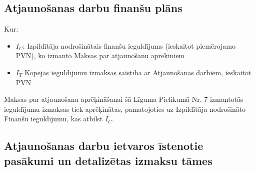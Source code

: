 \begin{center}
\end{center}

\subsection{Atjaunošanas darbu finanšu plāns}


\begin{center}
\end{center}

Kur:
\begin{itemize}
  \item $I_C$:    Izpildītāja nodrošinātais finanšu ieguldījums (ieskaitot piemērojamo PVN), ko izmanto Maksas par atjaunošanu aprēķiniem
  \item $I_T$     Kopējās ieguldījumu izmaksas saistībā ar Atjaunošanas darbiem, ieskaitot PVN
\end{itemize}

Maksas par atjaunošanu aprēķināšanai šā Līguma Pielikumā Nr. 7 izmantotās ieguldījumu izmaksas tiek aprēķinātas, pamatojoties uz Izpildītāja nodrošināto Finanšu ieguldījumu, kas atbilst $I_C$.

\subsection{Atjaunošanas darbu ietvaros īstenotie pasākumi un detalizētas izmaksu tāmes}

